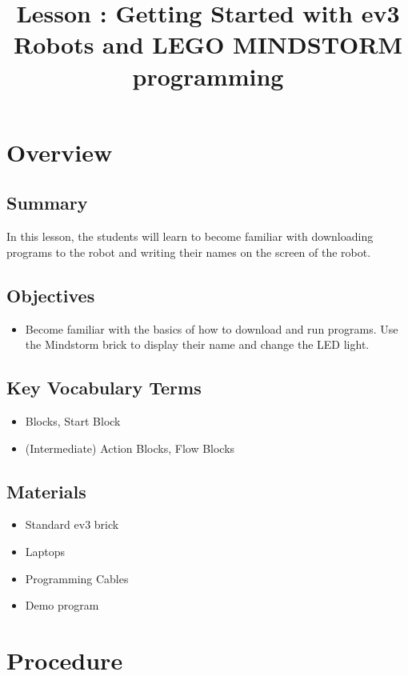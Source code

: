 \documentclass{lessonplan}
\title{Lesson \lessonNumber: Getting Started with ev3 Robots and LEGO MINDSTORM programming }
\author{\linkHome}
\date{}
\begin{document}
  \maketitle

  \section{Overview}
    \subsection{Summary}
      In this lesson, the students will learn to become familiar with downloading programs to the robot and writing their names on the screen of the robot.


    \subsection{Objectives}
    \begin{itemize}
      \item Become familiar with the basics of how to download and run programs. Use the Mindstorm brick to display their name and change the LED light.  
      

    \end{itemize}
    
    
    \subsection{Key Vocabulary Terms}
    \begin{itemize}
      \item Blocks, Start Block
      \item (Intermediate) Action Blocks, Flow Blocks
      
      
    \end{itemize}
    \subsection{Materials}
      \begin{itemize}
        \item Standard ev3 brick
        \item Laptops
        \item Programming Cables
        \item Demo program
      \end{itemize}
      
      
  \section{Procedure}
\end{document}

